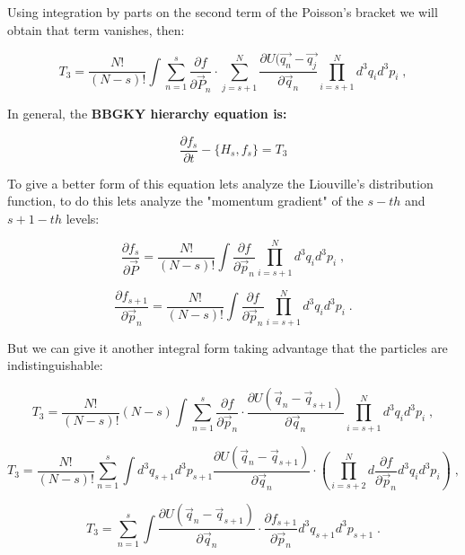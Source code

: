 \documentclass[spanish,notitlepage,letterpaper,11pt]{article} %
\numberwithin{equation}{subsection}
\begin{document}
    Using integration by parts on the second term of the Poisson's bracket we will obtain that term vanishes, then:

    \begin{equation}
        T_3 = \frac{N!}{(N-s)!}\int \sum_{n=1}^s \frac{\partial f}{\partial \Vec{P}_n}\cdot \sum_{j=s+1}^N\frac{\partial U(\Vec{q_n} - \Vec{q_j}}{\partial \Vec{q}_n}\prod_{i=s+1}^Nd^3q_id^3p_i\;,
    \end{equation}

    In general, the \textbf{BBGKY hierarchy equation is:}

    \begin{equation}
        \frac{\partial f_s}{\partial t} - \{H_s,f_s\} = T_3
    \end{equation}

    To give a better form of this equation lets analyze the Liouville's distribution function, to do this lets analyze the "momentum gradient" of the $s-th$ and $s+1-th$ levels:

    \begin{equation}
        \frac{\partial f_s}{\partial \Vec{P}} = \frac{N!}{(N-s)!}\int \frac{\partial f}{\partial \Vec{p}_n}\prod_{i=s+1}^Nd^3q_id^3p_i\;,
    \end{equation}

    \begin{equation}
        \frac{\partial f_{s+1}}{\partial \Vec{p}_n} = \frac{N!}{(N-s)!}\int \frac{\partial f}{\partial \Vec{p}_n}\prod_{i=s+1}^Nd^3q_id^3p_i\;.
    \end{equation}

    But we can give it another integral form taking advantage  that the particles are indistinguishable:

    \begin{equation*}
        T_3 = \frac{N!}{(N-s)!}(N-s)\int \sum_{n=1}^s \frac{\partial f}{\partial \Vec{p}_n}\cdot \frac{\partial U(\Vec{q}_n - \Vec{q}_{s+1})}{\partial \Vec{q}_n}\prod_{i=s+1}^Nd^3q_id^3p_i\;,
    \end{equation*}

    \begin{equation*}
        T_3 = \frac{N!}{(N-s)!}\sum_{n=1}^s\int d^3q_{s+1}d^3p_{s+1} \frac{\partial U(\Vec{q}_n - \Vec{q}_{s+1})}{\partial \Vec{q}_n}\cdot \left(\prod_{i=s+2}^Nd\frac{\partial f}{\partial \Vec{p}_n}d^3q_id^3p_i \right)\;,
    \end{equation*}

    \begin{equation}
        T_3 = \sum_{n=1}^s\int\frac{\partial U(\Vec{q}_n - \Vec{q}_{s+1})}{\partial \Vec{q}_n}\cdot \frac{\partial f_{s+1}}{\partial \Vec{p}_n}d^3q_{s+1}d^3p_{s+1}\;.
    \end{equation}
\end{document}
